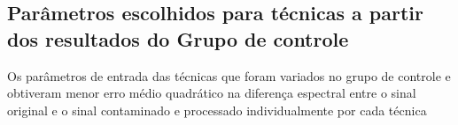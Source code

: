 







\subsection{Parâmetros escolhidos para técnicas a partir dos resultados do Grupo de controle}

Os parâmetros de entrada das técnicas que foram variados no grupo de controle e obtiveram menor erro médio quadrático na diferença espectral entre o sinal original e o sinal contaminado e processado individualmente por cada técnica 

